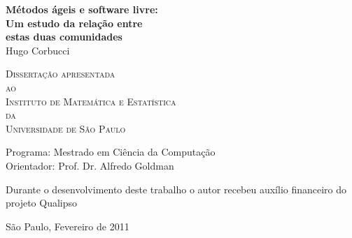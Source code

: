 \documentclass[11pt,twoside,a4paper]{book}
\begin{document}
\frontmatter
\fancyhead[RO]{{\footnotesize\rightmark}\hspace{2em}\thepage}
\setcounter{tocdepth}{2}
\fancyhead[LE]{\thepage\hspace{2em}\footnotesize{\leftmark}}
\fancyhead[RE,LO]{}
\fancyhead[RO]{{\footnotesize\rightmark}\hspace{2em}\thepage}

\onehalfspacing %


\thispagestyle{empty}
\begin{center}
  \vspace*{2.3cm}
  \textbf{\Large{Métodos ágeis e software livre:\\
      Um estudo da relação entre\\
      estas duas comunidades}}\\
	
  \vspace*{1.2cm} \Large{Hugo Corbucci}
    
  \vskip 2cm \textsc{
    Dissertação apresentada\\[-0.25cm]
    ao\\[-0.25cm]
    Instituto de Matemática e Estatística\\[-0.25cm]
    da\\[-0.25cm]
    Universidade de São Paulo}
    
  \vskip 1.5cm
  Programa: Mestrado em Ciência da Computação\\
  Orientador: Prof. Dr. Alfredo Goldman

  \vskip 1cm \normalsize{Durante o desenvolvimento deste trabalho o
    autor recebeu auxílio financeiro do projeto Qualipso}
	
  \vskip 0.5cm \normalsize{São Paulo, Fevereiro de 2011}
\end{center}
\end{document}
